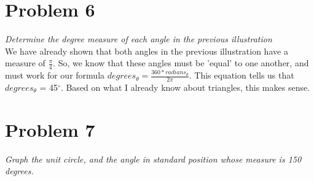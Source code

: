 \documentclass[11pt]{article} %
\newcommand\tab[1][1cm]{\hspace*{#1}}
\begin{document}
\section{Problem 6}
\textit{Determine the degree measure of each angle in the previous illustration}
\\
\tab We have already shown that both angles in the previous illustration have a measure of $\frac{\pi}{4}$. So, we know that these angles must be 'equal' to one another, and must work for our formula $degrees_\theta = \frac{360*radians_\theta}{2\pi}$. This equation tells us that $degrees_\theta$ = 45$^{\circ}$. Based on what I already know about triangles, this makes sense. 

\section{Problem 7}
\textit{Graph the unit circle, and the angle in standard position whose measure is 150 degrees.}
\end{document}
